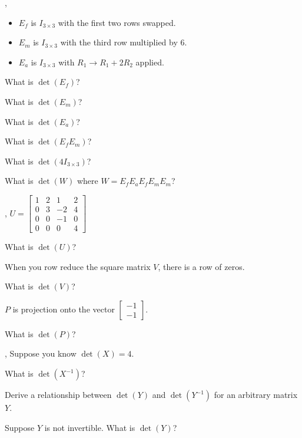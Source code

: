 \documentclass[letter]{article}
\newcommand{\mat}[1]{\begin{bmatrix}#1\end{bmatrix}}
\begin{document}
	\vspace{-.2in}
	\sep
	\vspace{-.3in}
	\begin{itemize}
		\item $E_f$ is $I_{3\times 3}$ with the first two rows swapped.
		\item $E_m$ is $I_{3\times 3}$ with the third row multiplied by 6.
		\item $E_a$ is $I_{3\times 3}$ with $R_1\to R_1+2R_2$ applied.
	\end{itemize}

	\begin{Enum}
		\item What is $\det(E_f)$?
		\item What is $\det(E_m)$?
		\item What is $\det(E_a)$?
		\item What is $\det(E_fE_m)$?
		\item What is $\det(4I_{3\times 3})$?
		\item What is $\det(W)$ where $W=E_fE_aE_fE_mE_m$?
	\end{Enum}

	\sep
	$U=\mat{1&2&1&2\\0&3&-2&4\\0&0&-1&0\\0&0&0&4}$
	\begin{Enum}
		\item What is $\det(U)$?
	\end{Enum}
	When you row reduce the square matrix $V$, there is a row of zeros.
	\begin{Enum}[resume]
		\item What is $\det(V)$?
	\end{Enum}

	$P$ is projection onto the vector $\mat{-1\\-1}$.
	\begin{Enum}[resume]
		\item What is $\det(P)$?
	\end{Enum}

	\sep
	Suppose you know $\det(X)=4$.
	\begin{Enum}
		\item What is $\det(X^{-1})$?
		\item Derive a relationship between $\det(Y)$
			and $\det(Y^{-1})$ for an arbitrary matrix $Y$.
		\item Suppose $Y$ is not invertible.  What is $\det(Y)$?
	\end{Enum}
\end{document}

